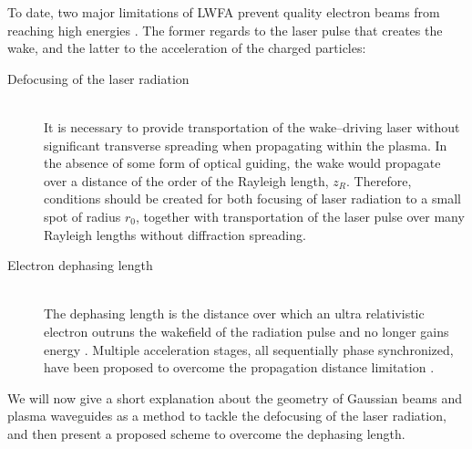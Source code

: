 \documentclass[../main.tex]{subfiles}
\begin{document}
To date, two major limitations of LWFA prevent quality electron beams from reaching high energies \cite{Esarey2009PhysicsAccelerators}. The former regards to the laser pulse that creates the wake, and the latter to the acceleration of the charged particles:
\begin{description}
  \item[\textnormal{Defocusing of the laser radiation}] \hfill \\ It is necessary to provide transportation of the wake--driving laser without significant transverse spreading when propagating within the plasma. In the absence of some form of optical guiding, the wake would propagate over a distance of the order of the Rayleigh length, $z_R$. Therefore, conditions should be created for both focusing of laser radiation to a small spot of radius $r_0$, together with transportation of the laser pulse over many Rayleigh lengths without diffraction spreading.
  \item[\textnormal{\label{dephasing-length}Electron dephasing length}] \hfill \\ The dephasing length is the distance over which an ultra relativistic electron outruns the wakefield of the radiation pulse and no longer gains energy \cite{Esarey2009PhysicsAccelerators,Sprangle1988LaserGuiding}. Multiple acceleration stages, all sequentially phase synchronized, have been proposed to overcome the propagation distance limitation \cite{Esarey2009PhysicsAccelerators}.
\end{description}

We will now give a short explanation about the geometry of Gaussian beams and plasma waveguides as a method to tackle the defocusing of the laser radiation, and then present a proposed scheme to overcome the dephasing length.
\end{document}
